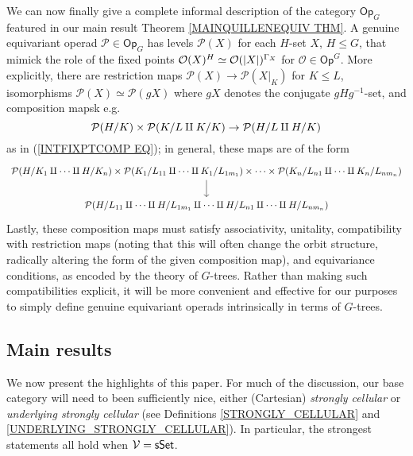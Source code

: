 \documentclass[a4paper,10pt]{article}%
\begin{document}
We can now finally give a complete informal description of the category $\mathsf{Op}_G$ featured in 
our main result Theorem \ref{MAINQUILLENEQUIV THM}.
A genuine equivariant operad
$\mathcal{P} \in \mathsf{Op}_G$
has levels $\mathcal{P}(X)$ for each $H$-set $X$, $H\leq G$, 
that mimick the role of the fixed points $\O(X)^H \simeq \O(|X|)^{\Gamma_X}$ for 
$\mathcal{O} \in \mathsf{Op}^G$.
More explicitly, there are restriction maps 
$\mathcal{P}(X) \to \mathcal{P}(X|_{K})$ for $K \leq L$,
isomorphisms
$\mathcal{P}(X)\simeq \mathcal{P}(g X)$
where $gX$ denotes the conjugate $gHg^{-1}$-set,
and composition mapsk e.g. %
\[
\P(H/K) \times \P(K/L \amalg K/K) \to \P(H/L \amalg H/K)
\]
as in (\ref{INTFIXPTCOMP EQ}); in general, these maps are of the form
\[
\begin{tikzcd}
  \mathcal{P}(H/K_1 \amalg \cdots \amalg H/K_n)
  \times
  \mathcal{P}(K_1 / L_{11} \amalg \cdots \amalg K_1/L_{1 m_1})
  \times \cdots \times
  \mathcal{P}(K_n / L_{n1} \amalg \cdots \amalg K_n / L_{n m_n})
  \arrow[d]
  \\
  \mathcal{P}(H / L_{11} \amalg \cdots \amalg H/L_{1 m_1}
  \amalg \cdots \amalg
  H / L_{n1} \amalg \cdots \amalg H/L_{n m_n}
  )
\end{tikzcd}
\]
Lastly, these composition maps %
must satisfy associativity, unitality, compatibility with restriction maps (noting that this will often change the orbit structure, radically altering the form of the given composition map), and equivariance conditions, as encoded by the theory of $G$-trees. Rather than making such compatibilities explicit, it will be more convenient and effective for our purposes to simply define genuine equivariant operads intrinsically in terms of $G$-trees.



\subsection{Main results}



We now present the highlights of this paper. 
For much of the discussion, our base category will need to been sufficiently nice, either (Cartesian) \textit{strongly cellular} or \textit{underlying strongly cellular} (see Definitions \ref{STRONGLY_CELLULAR} and \ref{UNDERLYING_STRONGLY_CELLULAR}). In particular, the strongest statements all hold when $\V = \sSet$.
\end{document}
